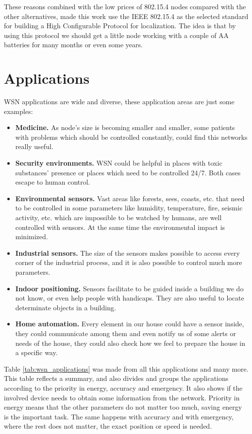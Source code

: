 These reasons combined with the low prices of 802.15.4 nodes compared with the other alternatives, made this work use the \ac{IEEE} 802.15.4 
as the selected standard for building a High Configurable Protocol for localization. The idea is that by using this protocol we should
get a little node working with a couple of AA batteries for many months or even some years.

\section{Applications}

\ac{WSN} applications are wide and diverse, these application areas are just some examples:

\begin{itemize}
 \item \textbf{Medicine.} As node's size is becoming smaller and smaller, some patients with problems which should be controlled constantly,
could find this networks really useful.
 \item \textbf{Security environments.} \ac{WSN} could be helpful in places with toxic substances' presence or places which need to be controlled
24/7. Both cases escape to human control.
 \item \textbf{Environmental sensors.} Vast areas like forests, sees, coasts, etc. that need to be controlled in some parameters like
humidity, temperature, fire, seismic activity, etc. which are impossible to be watched by humans, are well controlled with sensors. At the same 
time the environmental impact is minimized.
 \item \textbf{Industrial sensors.} The size of the sensors makes possible to access every corner of the industrial process, and it is also
possible to control much more parameters.
 \item \textbf{Indoor positioning.} Sensors facilitate to be guided inside a building we do not know, or even help people with handicaps.
They are also useful to locate determinate objects in a building.
 \item \textbf{Home automation.} Every element in our house could have a sensor inside, they could communicate among them and even notify us
of some alerts or needs of the house, they could also check how we feel to prepare the house in a specific way.
\end{itemize}

Table \ref{tab:wsn_applications} was made from all this applications and many more. This table reflects a summary, and also divides and groups
the applications according to the priority in energy, accuracy and emergency. It also shows if the involved device needs to obtain some information
from the network. Priority in energy means that the other parameters do not matter too much, saving energy is the important task. 
The same happens with accuracy and with emergency, where the rest does not matter, the exact position or speed is needed.

